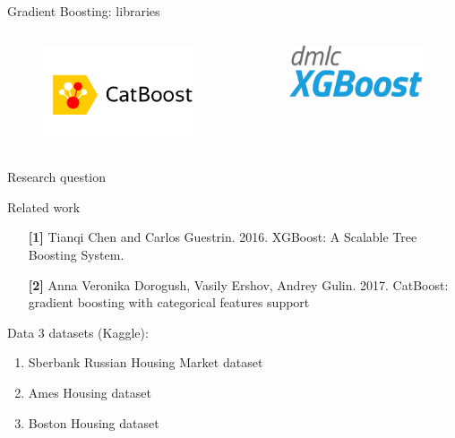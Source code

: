 \begin{frame}{Gradient Boosting: libraries}
\begin{columns}
		
		\begin{column}{0.33\textwidth}
			\centering
			\begin{figure}
				\includegraphics[width=\columnwidth]{figures/catboost}
			\end{figure}
		\end{column}
		
		\begin{column}{0.33\textwidth}
			\centering
			\begin{figure}
				\includegraphics[width=\columnwidth]{figures/xgboost}
			\end{figure}
		\end{column}
		
	\end{columns}
\end{frame}

\begin{frame}{Research question}
	
\end{frame}

\begin{frame}{Related work}
	\begin{enumerate}
		\item[\textbf{[1]}] Tianqi Chen and Carlos Guestrin. 2016. XGBoost: A Scalable Tree Boosting System. 
		\item[\textbf{[2]}] Anna Veronika Dorogush, Vasily Ershov, Andrey Gulin. 2017. CatBoost: gradient boosting with categorical features support
	\end{enumerate}
\end{frame}

\begin{frame}{Data}
	3 datasets (Kaggle):
	\begin{enumerate}
		\item Sberbank Russian Housing Market dataset 
		\item Ames Housing dataset 
		\item Boston Housing dataset 
	\end{enumerate}
\end{frame}
